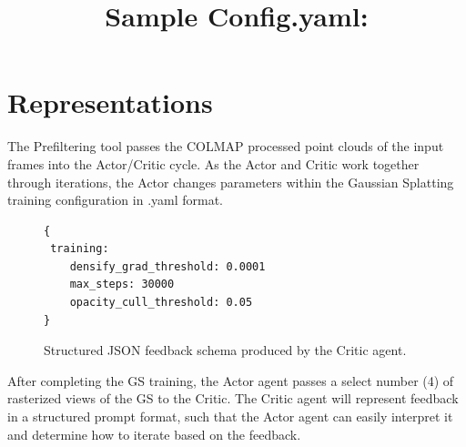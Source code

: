 \section{Representations}
\label{sec:representations}

The Prefiltering tool passes the COLMAP processed point clouds of the input frames into the Actor/Critic cycle. As the Actor and Critic work together through iterations, the Actor changes parameters within the Gaussian Splatting training configuration in .yaml format.

\newpage
\noindent\title{Sample Config.yaml:}
\begin{figure}[h]
\centering
\begin{verbatim}
{
 training:
    densify_grad_threshold: 0.0001
    max_steps: 30000
    opacity_cull_threshold: 0.05
}
\end{verbatim}
\caption{Structured JSON feedback schema produced by the Critic agent.}
\label{fig:json-schema}
\end{figure}


\noindent After completing the GS training, the Actor agent passes a select number (4) of rasterized views of the GS to the Critic. The Critic agent will represent feedback in a structured prompt format, such that the Actor agent can easily interpret it and determine how to iterate based on the feedback.